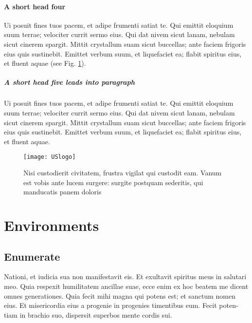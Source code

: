 \documentclass[numbers,compress]{vmsta}
\theoremstyle{definition}
\begin{document}
\paragraph{A short head four}
Ui posuit fines tuos pacem,
et adipe frumenti satiat te. Qui emittit eloquium suum terrae;
velociter currit sermo eius.  Qui dat nivem sicut lanam, nebulam
sicut cinerem spargit. Mittit crystallum suam sicut buccellas; ante
faciem frigoris eius quis sustinebit. Emittet verbum suum, et
liquefaciet ea; flabit spiritus eius, et fluent aquae (see Fig. \ref{f1}).

\subparagraph{A short head five leads into paragraph} Ui posuit fines tuos pacem,
et adipe frumenti satiat te. Qui emittit eloquium suum terrae;
velociter currit sermo eius.  Qui dat nivem sicut lanam, nebulam
sicut cinerem spargit. Mittit crystallum suam sicut buccellas; ante
faciem frigoris eius quis sustinebit. Emittet verbum suum, et
liquefaciet ea; flabit spiritus eius, et fluent aquae.


\begin{figure}[t]
\texttt{[image: USlogo]}%
\caption{%
Nisi custodierit civitatem, frustra vigilat qui custodit eam. Vanum
est vobis ante lucem surgere: surgite postquam sederitis, qui
manducatis panem doloris}\label{f1} %
\end{figure}


\section{Environments}

\subsection{Enumerate}

Nationi, et iudicia sua non manifestavit eis. Et exultavit spiritus meus
in salutari meo.  Quia respexit humilitatem ancillae suae, ecce enim ex
hoc beatem me dicent omnes generationes. Quia fecit mihi magna qui potens
est; et sanctum nomen eius. Et misericordia eius a progenie in progenies
timentibus eum. Fecit poten-tiam in brachio suo, dispersit superbos mente
cordis sui.
\end{document}
